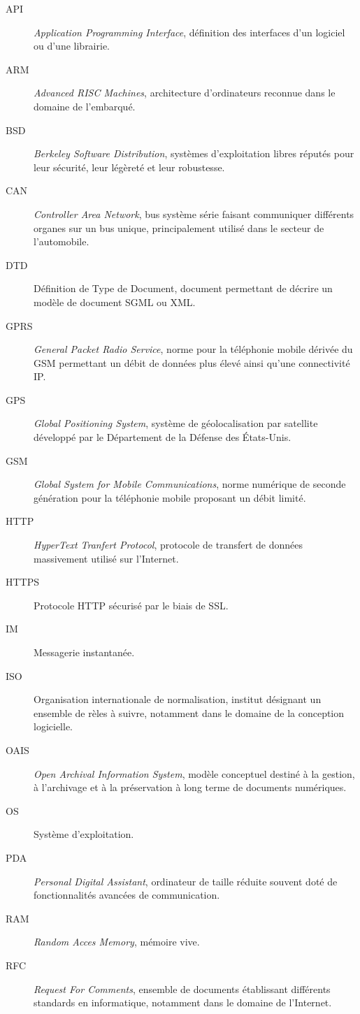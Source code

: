 \documentclass[a4paper, 11pt, final]{article}
\begin{document}
\begin{description}
\item[API] \emph{Application Programming Interface}, définition des interfaces d'un logiciel ou d'une librairie.
\item[ARM] \emph{Advanced RISC Machines}, architecture d'ordinateurs reconnue dans le domaine de l'embarqué.
\item[BSD] \emph{Berkeley Software Distribution}, systèmes d'exploitation libres réputés pour leur sécurité, leur légèreté et leur robustesse.
\item[CAN] \emph{Controller Area Network}, bus système série faisant communiquer différents organes sur un bus unique, principalement utilisé dans le secteur de l'automobile.
\item[DTD] Définition de Type de Document, document permettant de décrire un modèle de document SGML ou XML.
\item[GPRS] \emph{General Packet Radio Service}, norme pour la téléphonie mobile dérivée du GSM permettant un débit de données plus élevé ainsi qu'une connectivité IP.
\item[GPS] \emph{Global Positioning System}, système de géolocalisation par satellite développé par le Département de la Défense des États-Unis.
\item[GSM] \emph{Global System for Mobile Communications}, norme numérique de seconde génération pour la téléphonie mobile proposant un débit limité.
\item[HTTP] \emph{HyperText Tranfert Protocol}, protocole de transfert de données massivement utilisé sur l'Internet.
\item[HTTPS] Protocole HTTP sécurisé par le biais de SSL.
\item[IM] Messagerie instantanée.
\item[ISO] Organisation internationale de normalisation, institut désignant un ensemble de rèles à suivre, notamment dans le domaine de la conception logicielle.
\item[OAIS] \emph{Open Archival Information System}, modèle conceptuel destiné à la gestion, à l'archivage et à la préservation à long terme de documents numériques.
\item[OS] Système d'exploitation.
\item[PDA] \emph{Personal Digital Assistant}, ordinateur de taille réduite souvent doté de fonctionnalités avancées de communication.
\item[RAM] \emph{Random Acces Memory}, mémoire vive.
\item[RFC] \emph{Request For Comments}, ensemble de documents établissant différents standards en informatique, notamment dans le domaine de l'Internet.

\end{description}
\end{document}
